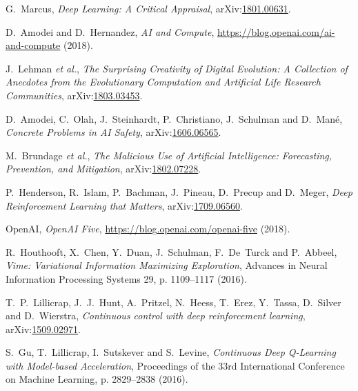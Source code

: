 \documentclass[11pt, a4paper]{report} %
\begin{document}
\begin{thebibliography}{99}
G.~Marcus, \textit{Deep Learning: A Critical Appraisal}, arXiv:\href{https://arxiv.org/abs/1801.00631}{1801.00631}. 




D.~Amodei and D.~Hernandez, \textit{AI and Compute}, \href{https://blog.openai.com/ai-and-compute}{https://blog.openai.com/ai-and-compute} (2018).


J.~Lehman \textit{et al.}, \textit{The Surprising Creativity of Digital Evolution: A Collection of Anecdotes from the Evolutionary Computation and Artificial Life Research Communities}, arXiv:\href{https://arxiv.org/abs/1803.03453}{1803.03453}. 




D.~Amodei, C.~Olah, J.~Steinhardt, P.~Christiano, J.~Schulman and D.~Mané, \textit{Concrete Problems in AI Safety}, arXiv:\href{https://arxiv.org/abs/1606.06565}{1606.06565}. 




M.~Brundage \textit{et al.}, \textit{The Malicious Use of Artificial Intelligence: Forecasting, Prevention, and Mitigation}, arXiv:\href{https://arxiv.org/abs/1802.07228}{1802.07228}. 




P.~Henderson, R.~Islam, P.~Bachman, J.~Pineau, D.~Precup and D.~Meger, \textit{Deep Reinforcement Learning that Matters}, arXiv:\href{https://arxiv.org/abs/1709.06560}{1709.06560}. 

OpenAI, \textit{OpenAI Five}, \href{https://blog.openai.com/openai-five}{https://blog.openai.com/openai-five} (2018).



R.~Houthooft, X.~Chen, Y.~Duan, J.~Schulman, F.~De~Turck and P.~Abbeel, \emph{Vime: Variational Information Maximizing Exploration}, Advances in Neural Information Processing Systems 29, p. 1109--1117 (2016).





T.~P.~Lillicrap, J.~J.~Hunt, A.~Pritzel, N.~Heess, T.~Erez, Y.~Tassa, D.~Silver and D.~Wierstra, \textit{Continuous control with deep reinforcement learning}, arXiv:\href{https://arxiv.org/abs/1509.02971}{1509.02971}.




S.~Gu, T.~Lillicrap, I.~Sutskever and S.~Levine, \textit{Continuous Deep Q-Learning with Model-based Acceleration}, Proceedings of the 33rd International Conference on Machine Learning, p. 2829--2838 (2016). 




\end{thebibliography}
\end{document}
